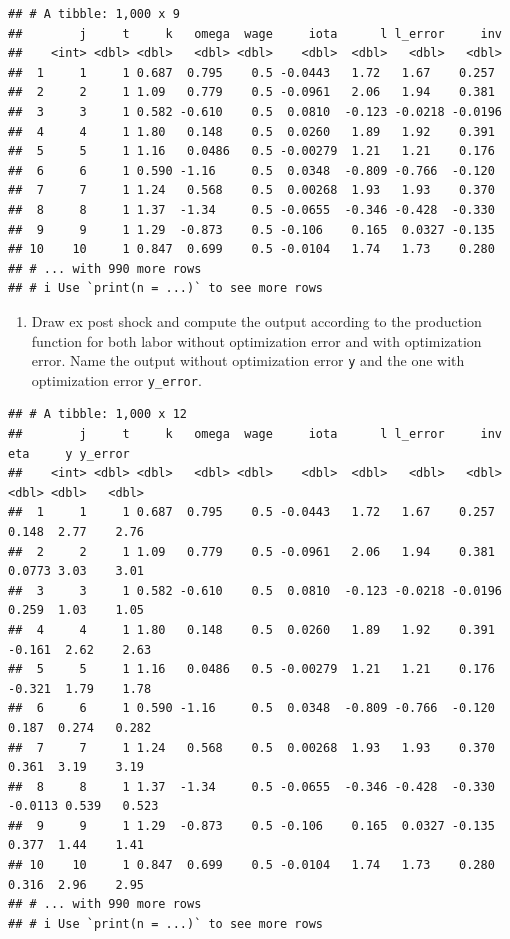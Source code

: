 \documentclass[
]{book}
\providecommand{\tightlist}{%
  \setlength{\itemsep}{0pt}\setlength{\parskip}{0pt}}
\begin{document}
\begin{verbatim}
## # A tibble: 1,000 x 9
##        j     t     k   omega  wage     iota      l l_error     inv
##    <int> <dbl> <dbl>   <dbl> <dbl>    <dbl>  <dbl>   <dbl>   <dbl>
##  1     1     1 0.687  0.795    0.5 -0.0443   1.72   1.67    0.257 
##  2     2     1 1.09   0.779    0.5 -0.0961   2.06   1.94    0.381 
##  3     3     1 0.582 -0.610    0.5  0.0810  -0.123 -0.0218 -0.0196
##  4     4     1 1.80   0.148    0.5  0.0260   1.89   1.92    0.391 
##  5     5     1 1.16   0.0486   0.5 -0.00279  1.21   1.21    0.176 
##  6     6     1 0.590 -1.16     0.5  0.0348  -0.809 -0.766  -0.120 
##  7     7     1 1.24   0.568    0.5  0.00268  1.93   1.93    0.370 
##  8     8     1 1.37  -1.34     0.5 -0.0655  -0.346 -0.428  -0.330 
##  9     9     1 1.29  -0.873    0.5 -0.106    0.165  0.0327 -0.135 
## 10    10     1 0.847  0.699    0.5 -0.0104   1.74   1.73    0.280 
## # ... with 990 more rows
## # i Use `print(n = ...)` to see more rows
\end{verbatim}

\begin{enumerate}
\def\labelenumi{\arabic{enumi}.}
\setcounter{enumi}{7}
\tightlist
\item
  Draw ex post shock and compute the output according to the production function for both labor without optimization error and with optimization error. Name the output without optimization error \texttt{y} and the one with optimization error \texttt{y\_error}.
\end{enumerate}

\begin{verbatim}
## # A tibble: 1,000 x 12
##        j     t     k   omega  wage     iota      l l_error     inv     eta     y y_error
##    <int> <dbl> <dbl>   <dbl> <dbl>    <dbl>  <dbl>   <dbl>   <dbl>   <dbl> <dbl>   <dbl>
##  1     1     1 0.687  0.795    0.5 -0.0443   1.72   1.67    0.257   0.148  2.77    2.76 
##  2     2     1 1.09   0.779    0.5 -0.0961   2.06   1.94    0.381   0.0773 3.03    3.01 
##  3     3     1 0.582 -0.610    0.5  0.0810  -0.123 -0.0218 -0.0196  0.259  1.03    1.05 
##  4     4     1 1.80   0.148    0.5  0.0260   1.89   1.92    0.391  -0.161  2.62    2.63 
##  5     5     1 1.16   0.0486   0.5 -0.00279  1.21   1.21    0.176  -0.321  1.79    1.78 
##  6     6     1 0.590 -1.16     0.5  0.0348  -0.809 -0.766  -0.120   0.187  0.274   0.282
##  7     7     1 1.24   0.568    0.5  0.00268  1.93   1.93    0.370   0.361  3.19    3.19 
##  8     8     1 1.37  -1.34     0.5 -0.0655  -0.346 -0.428  -0.330  -0.0113 0.539   0.523
##  9     9     1 1.29  -0.873    0.5 -0.106    0.165  0.0327 -0.135   0.377  1.44    1.41 
## 10    10     1 0.847  0.699    0.5 -0.0104   1.74   1.73    0.280   0.316  2.96    2.95 
## # ... with 990 more rows
## # i Use `print(n = ...)` to see more rows
\end{verbatim}
\end{document}
